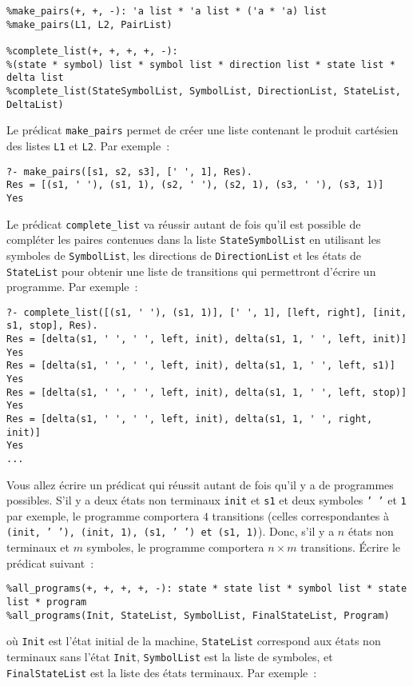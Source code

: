 \documentclass[a4paper]{article}
\begin{document}
\begin{verbatim}
%make_pairs(+, +, -): 'a list * 'a list * ('a * 'a) list
%make_pairs(L1, L2, PairList)

%complete_list(+, +, +, +, -): 
%(state * symbol) list * symbol list * direction list * state list * delta list 
%complete_list(StateSymbolList, SymbolList, DirectionList, StateList, DeltaList)
\end{verbatim}
Le prédicat \texttt{make_pairs} permet de créer une liste contenant le produit cartésien des listes \texttt{L1} et \texttt{L2}. Par exemple~:
\begin{verbatim}
?- make_pairs([s1, s2, s3], [' ', 1], Res).
Res = [(s1, ' '), (s1, 1), (s2, ' '), (s2, 1), (s3, ' '), (s3, 1)]
Yes
\end{verbatim}
Le prédicat \texttt{complete_list} va réussir autant de fois qu'il est possible de compléter les paires contenues dans la liste \texttt{StateSymbolList}
en utilisant les symboles de \texttt{SymbolList}, les directions de \texttt{DirectionList}
et les états de \texttt{StateList} pour obtenir une liste de transitions qui permettront d'écrire un programme. Par exemple~:
\begin{verbatim}
?- complete_list([(s1, ' '), (s1, 1)], [' ', 1], [left, right], [init, s1, stop], Res).
Res = [delta(s1, ' ', ' ', left, init), delta(s1, 1, ' ', left, init)]
Yes
Res = [delta(s1, ' ', ' ', left, init), delta(s1, 1, ' ', left, s1)]
Yes
Res = [delta(s1, ' ', ' ', left, init), delta(s1, 1, ' ', left, stop)]
Yes
Res = [delta(s1, ' ', ' ', left, init), delta(s1, 1, ' ', right, init)]
Yes
...
\end{verbatim}

Vous allez écrire un prédicat qui réussit autant de fois qu'il y a de programmes possibles. S'il y a deux états non terminaux \texttt{init} et \texttt{s1} et deux symboles \texttt{' '} et \texttt{1} par exemple,
le programme comportera $4$ transitions (celles correspondantes à \texttt{(init, ' '), (init, 1), (s1, ' ') et (s1, 1)}). Donc, s'il y a $n$ états non terminaux
et $m$ symboles, le programme comportera $n\times m$ transitions.
Écrire le prédicat suivant~:
\begin{verbatim}
%all_programs(+, +, +, +, -): state * state list * symbol list * state list * program 
%all_programs(Init, StateList, SymbolList, FinalStateList, Program)
\end{verbatim}
où \texttt{Init} est l'état initial de la machine, \texttt{StateList} correspond aux états non terminaux sans l'état \texttt{Init}, \texttt{SymbolList} est la liste
de symboles, et \texttt{FinalStateList} est la liste des états terminaux. Par exemple~: 
\end{document}

